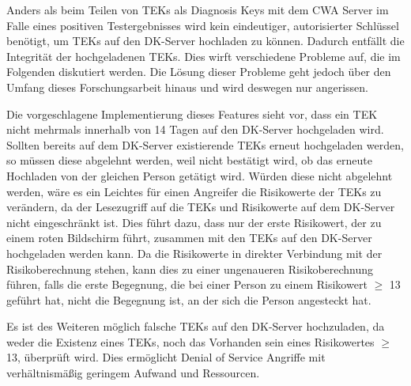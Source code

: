 \documentclass[conference,compsoc]{IEEEtran}
\begin{document}
Anders als beim Teilen von TEKs als Diagnosis Keys mit dem CWA Server im Falle eines positiven Testergebnisses wird kein eindeutiger, 
autorisierter Schlüssel benötigt, um TEKs auf den DK-Server hochladen zu können.
Dadurch entfällt die Integrität der hochgeladenen TEKs.
Dies wirft verschiedene Probleme auf, die im Folgenden diskutiert werden. 
Die Lösung dieser Probleme geht jedoch über den Umfang dieses Forschungsarbeit hinaus und wird deswegen nur angerissen.

Die vorgeschlagene Implementierung dieses Features sieht vor, dass ein TEK nicht mehrmals innerhalb von 14 Tagen auf den DK-Server hochgeladen wird.
Sollten bereits auf dem DK-Server existierende TEKs erneut hochgeladen werden, so müssen diese abgelehnt werden, weil nicht bestätigt wird, 
ob das erneute Hochladen von der gleichen Person getätigt wird.
Würden diese nicht abgelehnt werden, wäre es ein Leichtes für einen Angreifer die Risikowerte der TEKs zu verändern, 
da der Lesezugriff auf die TEKs und Risikowerte auf dem DK-Server nicht eingeschränkt ist.
Dies führt dazu, dass nur der erste Risikowert, der zu einem roten Bildschirm führt, zusammen mit den TEKs auf den DK-Server hochgeladen werden kann.
Da die Risikowerte in direkter Verbindung mit der Risikoberechnung stehen, kann dies zu einer ungenaueren Risikoberechnung führen, 
falls die erste Begegnung, die bei einer Person zu einem Risikowert $\geq$ 13 geführt hat, nicht die Begegnung ist, an der sich die Person angesteckt hat.

Es ist des Weiteren möglich falsche TEKs auf den DK-Server hochzuladen, 
da weder die Existenz eines TEKs, noch das Vorhanden sein eines Risikowertes $\geq$ 13, überprüft wird.
Dies ermöglicht Denial of Service Angriffe mit verhältnismäßig geringem Aufwand und Ressourcen.\\
\end{document}
